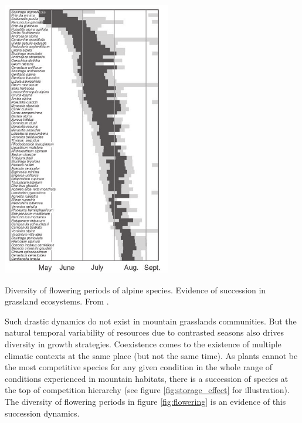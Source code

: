 \begin{marginfigure}
    \includegraphics{./1_Introduction/graphics/flowering_m.pdf}
  \caption[Flowering periods of alpine species]{Diversity of flowering periods of alpine species. Evidence of succession in grassland ecosystems. From \cite{korner_alpine_2003}.}
  \label{fig:flowering}
\end{marginfigure}

Such drastic dynamics do not exist in mountain grasslands communities. But the natural temporal variability of resources due to contrasted seasons also drives diversity in growth strategies. Coexistence comes to the existence of multiple climatic contexts at the same place (but not the same time). As plants cannot be the most competitive species for any given condition in the whole range of conditions experienced in mountain habitats, there is a succession of species at the top of competition hierarchy \parencite{adler_climate_2006} (see figure \ref{fig:storage_effect} for illustration). The diversity of flowering periods in figure \ref{fig:flowering} is an evidence of this succession dynamics.

